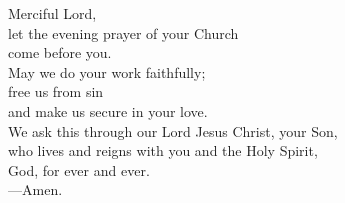 \prayer


\begin{prayerverse}
Merciful Lord,\\
let the evening prayer of your Church\\
come before you.\\
May we do your work faithfully;\\
free us from sin\\
and make us secure in your love.\\
We ask this through our Lord Jesus Christ, your Son,\\
who lives and reigns with you and the Holy Spirit,\\
God, for ever and ever.\\
{\color{red}---\thinspace}Amen.
\end{prayerverse}

